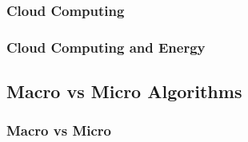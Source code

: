 \documentclass{beamer}
\begin{document}
\begin{frame}
  \frametitle{Cloud Computing}
 

\end{frame}

\begin{frame}
  \frametitle{Cloud Computing and Energy}
 

\end{frame}

\subsection{Macro vs Micro Algorithms}

\begin{frame}
  \frametitle{Macro vs Micro}
 

\end{frame}
\end{document}

